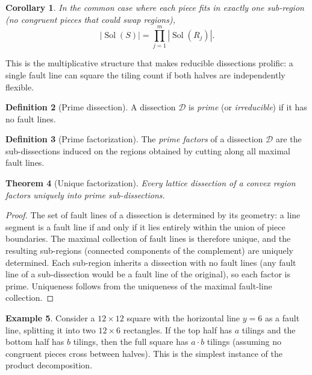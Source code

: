 \documentclass[12pt]{article}
\newtheorem{theorem}{Theorem}[section]
\newtheorem{corollary}[theorem]{Corollary}
\theoremstyle{definition}
\newtheorem{definition}[theorem]{Definition}
\newtheorem{example}[theorem]{Example}
\theoremstyle{remark}
\newcommand{\Sol}{\operatorname{Sol}}
\begin{document}
\begin{corollary}
\label{cor:count}
In the common case where each piece fits in exactly one sub-region (no
congruent pieces that could swap regions),
\[
|\Sol(S)| = \prod_{j=1}^{m} |\Sol(R_j)|.
\]
\end{corollary}

This is the multiplicative structure that makes reducible dissections
prolific: a single fault line can square the tiling count if both halves
are independently flexible.

\begin{definition}[Prime dissection]
\label{def:prime}
A dissection $\mathcal{D}$ is \emph{prime} (or \emph{irreducible}) if
it has no fault lines.
\end{definition}

\begin{definition}[Prime factorization]
\label{def:factorization}
The \emph{prime factors} of a dissection $\mathcal{D}$ are the
sub-dissections induced on the regions obtained by cutting along all
maximal fault lines.
\end{definition}

\begin{theorem}[Unique factorization]
\label{thm:unique}
Every lattice dissection of a convex region factors uniquely into prime
sub-dissections.
\end{theorem}

\begin{proof}
The set of fault lines of a dissection is determined by its geometry:
a line segment is a fault line if and only if it lies entirely within the
union of piece boundaries. The maximal collection of fault lines is
therefore unique, and the resulting sub-regions (connected components of
the complement) are uniquely determined. Each sub-region inherits a
dissection with no fault lines (any fault line of a sub-dissection would
be a fault line of the original), so each factor is prime. Uniqueness
follows from the uniqueness of the maximal fault-line collection.
\end{proof}

\begin{example}
\label{ex:horizontal}
Consider a $12 \times 12$ square with the horizontal line $y = 6$ as a
fault line, splitting it into two $12 \times 6$ rectangles. If the top
half has $a$ tilings and the bottom half has $b$ tilings, then the full
square has $a \cdot b$ tilings (assuming no congruent pieces cross
between halves). This is the simplest instance of the product
decomposition.
\end{example}
\end{document}
